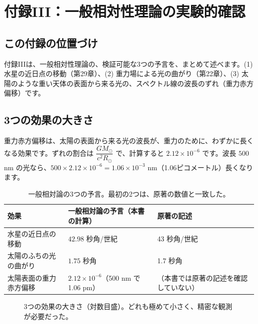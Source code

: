 \documentclass[a4paper,11pt,openany]{ltjsbook}
\begin{document}
\chapter{付録III：一般相対性理論の実験的確認}

\section{この付録の位置づけ}

付録IIIは、一般相対性理論の、検証可能な3つの予言を、まとめて述べます。(1) 水星の近日点の移動（第29章）、(2) 重力場による光の曲がり（第22章）、(3) 太陽のような重い天体の表面から来る光の、スペクトル線の波長のずれ（重力赤方偏移）です。

\section{3つの効果の大きさ}

重力赤方偏移は、太陽の表面から来る光の波長が、重力のために、わずかに長くなる効果です。ずれの割合は $\dfrac{GM_\odot}{c^2R_\odot}$ で、計算すると $2.12\times10^{-6}$ です。波長 $500$ nm の光なら、$500\times2.12\times10^{-6}=1.06\times10^{-3}$ nm（1.06ピコメートル）長くなります。

\begin{table}[htbp]
\centering
\small
\begin{tabular}{p{3.6cm}p{5cm}p{4.6cm}}
\toprule
効果 & 一般相対論の予言（本書の計算） & 原著の記述\\
\midrule
水星の近日点の移動 & $42.98$ 秒角/世紀 & 43 秒角/世紀\\
太陽のふちの光の曲がり & $1.75$ 秒角 & 1.7 秒角\\
太陽表面の重力赤方偏移 & $2.12\times10^{-6}$（500 nm で 1.06 pm） & （本書では原著の記述を確認していない）\\
\bottomrule
\end{tabular}
\caption{一般相対論の3つの予言。最初の2つは、原著の数値と一致した。}
\end{table}

\begin{figure}[htbp]
\centering
{}
\caption{3つの効果の大きさ（対数目盛）。どれも極めて小さく、精密な観測が必要だった。}
\end{figure}
\end{document}
